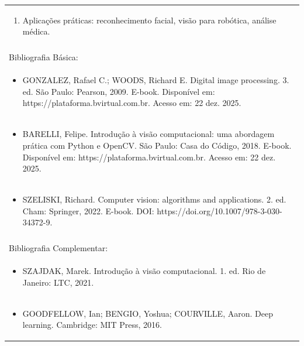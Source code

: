 \documentclass[11pt]{article}
\begin{document}
\begin{center}
\begin{longtable}{|p{4cm}|p{4cm}|p{4cm}|p{4cm}|}
\multicolumn{4}{|p{\dimexpr 16cm + 6\tabcolsep\relax}|}{\begin{enumerate}[start=10]\item Aplicações práticas: reconhecimento facial, visão para robótica, análise médica.\end{enumerate}}\\
\multicolumn{4}{|p{\dimexpr 16cm + 6\tabcolsep\relax}|}{}\\
\hline
\multicolumn{4}{|p{16cm}|}{Bibliografia Básica:}\\*
\multicolumn{4}{|p{\dimexpr 16cm + 6\tabcolsep\relax}|}{\begin{itemize}\item GONZALEZ, Rafael C.; WOODS, Richard E. Digital image processing. 3. ed. São Paulo: Pearson, 2009. E-book. Disponível em: https://plataforma.bvirtual.com.br. Acesso em: 22 dez. 2025.\end{itemize}}\\
\multicolumn{4}{|p{\dimexpr 16cm + 6\tabcolsep\relax}|}{\begin{itemize}\item BARELLI, Felipe. Introdução à visão computacional: uma abordagem prática com Python e OpenCV. São Paulo: Casa do Código, 2018. E-book. Disponível em: https://plataforma.bvirtual.com.br. Acesso em: 22 dez. 2025.\end{itemize}}\\
\multicolumn{4}{|p{\dimexpr 16cm + 6\tabcolsep\relax}|}{\begin{itemize}\item SZELISKI, Richard. Computer vision: algorithms and applications. 2. ed. Cham: Springer, 2022. E-book. DOI: https://doi.org/10.1007/978-3-030-34372-9.\end{itemize}}\\
\multicolumn{4}{|p{16cm}|}{}\\
\hline
\multicolumn{4}{|p{16cm}|}{Bibliografia Complementar:}\\*
\multicolumn{4}{|p{\dimexpr 16cm + 6\tabcolsep\relax}|}{\begin{itemize}\item SZAJDAK, Marek. Introdução à visão computacional. 1. ed. Rio de Janeiro: LTC, 2021.\end{itemize}}\\
\multicolumn{4}{|p{\dimexpr 16cm + 6\tabcolsep\relax}|}{\begin{itemize}\item GOODFELLOW, Ian; BENGIO, Yoshua; COURVILLE, Aaron. Deep learning. Cambridge: MIT Press, 2016.\end{itemize}}\\

\end{longtable}
\end{center}
\end{document}
